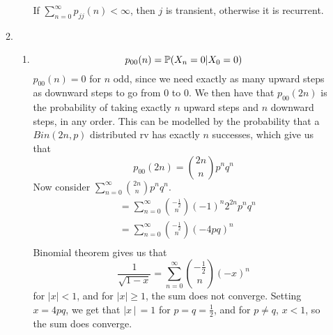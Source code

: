 \documentclass{article}
\begin{document}
\begin{enumerate}
\begin{enumerate}
\begin{enumerate}
If $\sum\limits^\infty_{n=0}p_{jj}(n) < \infty$, then $j$ is transient,
otherwise it is recurrent.

\end{enumerate}
\item
\begin{enumerate}
\item
$$
p_{00}(n) = \mathbb{P} (X_n = 0 | X_0 = 0)
$$
$p_{00}(n) = 0$ for $n$ odd, since we need exactly as many upward steps as
downward steps to go from $0$ to $0$. We then have that $p_{00}(2n)$ is the
probability of taking exactly $n$ upward steps and $n$ downward steps, in any
order. This can be modelled by the probability that a $Bin(2n,p)$ distributed rv
has exactly $n$ successes, which give us that
$$
p_{00}(2n) = {2n \choose n} p^nq^n
$$
Now consider $\sum\limits^\infty_{n=0}{2n\choose n} p^nq^n$.
\begin{align*}
&= \sum^\infty_{n=0}{-\frac{1}{2}\choose n}(-1)^n 2^{2n} p^n q^n\\
&= \sum^\infty_{n=0}{-\frac{1}{2}\choose n}(-4pq)^n\\
\end{align*}
Binomial theorem gives us that
$$
\frac{1}{\sqrt{1-x}} = \sum^\infty_{n=0}{-\frac{1}{2}\choose n}(-x)^n 
$$
for $|x|<1$, and for $|x|\geqslant 1$, the sum does not converge. Setting
$x=4pq$, we get that $|x\!\,|\,=1$ for $p=q=\frac{1}{2}$, and for $p \neq q$,
$x<1$, so the sum does converge.


\end{enumerate}
\end{enumerate}
\end{enumerate}
\end{document}
